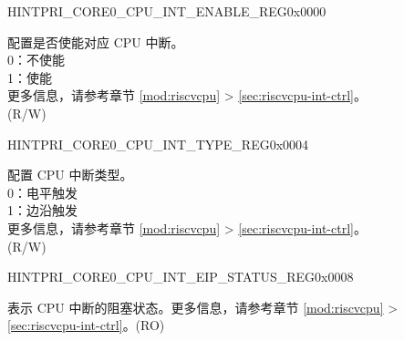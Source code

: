 \begin{register}{H}{INTPRI\_CORE0\_CPU\_INT\_ENABLE\_REG}{0x0000}\label{regdesc:INTPRICORE0CPUINTENABLEREG}
%
\regnewline%
\begin{regdesc}\begin{reglist}
\label{fielddesc:INTPRICORE0CPUINTENABLE}\item [INTPRI\_CORE0\_CPU\_INT\_ENABLE] 配置是否使能对应 CPU 中断。\\
0：不使能\\
1：使能\\
更多信息，请参考章节 \ref{mod:riscvcpu} \textit{} >  \ref{sec:riscvcpu-int-ctrl}\textit{}。\\
(R/W)
\end{reglist}\end{regdesc}
\end{register}


\begin{register}{H}{INTPRI\_CORE0\_CPU\_INT\_TYPE\_REG}{0x0004}\label{regdesc:INTPRICORE0CPUINTTYPEREG}
%
\regnewline%
\begin{regdesc}\begin{reglist}
\label{fielddesc:INTPRICORE0CPUINTTYPE}\item [INTPRI\_CORE0\_CPU\_INT\_TYPE] 配置 CPU 中断类型。\\
0：电平触发\\
1：边沿触发\\
更多信息，请参考章节 \ref{mod:riscvcpu} \textit{} >  \ref{sec:riscvcpu-int-ctrl}\textit{}。\\
(R/W)
\end{reglist}\end{regdesc}
\end{register}


\begin{register}{H}{INTPRI\_CORE0\_CPU\_INT\_EIP\_STATUS\_REG}{0x0008}\label{regdesc:INTPRICORE0CPUINTEIPSTATUSREG}
%
\regnewline%
\begin{regdesc}\begin{reglist}
\label{fielddesc:INTPRICORE0CPUINTEIPSTATUS}\item [INTPRI\_CORE0\_CPU\_INT\_EIP\_STATUS] 表示 CPU 中断的阻塞状态。更多信息，请参考章节 \ref{mod:riscvcpu} \textit{} >  \ref{sec:riscvcpu-int-ctrl}\textit{}。(RO)
\end{reglist}\end{regdesc}
\end{register}


